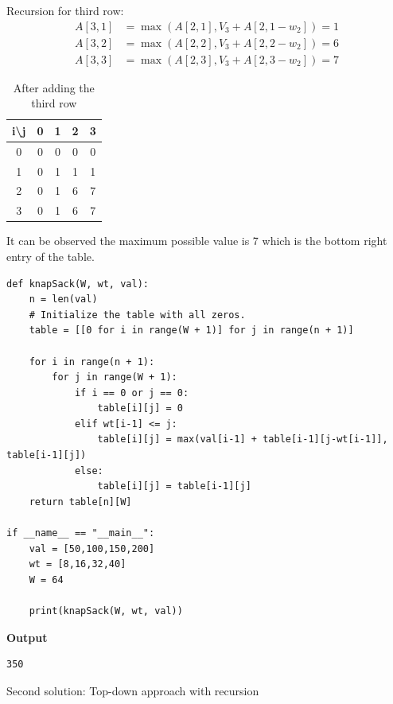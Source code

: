 \documentclass[a4paper,11pt]{book}
\begin{document}
\noindent Recursion for third row:
\begin{align*}
    A[3,1] &= \max(A[2,1], V_3 + A[2,1-w_2]) = 1\\
    A[3,2] &= \max(A[2,2], V_3 + A[2,2-w_2]) = 6\\
    A[3,3] &= \max(A[2,3], V_3 + A[2,3-w_2]) = 7
\end{align*}

\begin{table}[ht]
\centering
\begin{tabular}{|c|c|c|c|c|}
\hline
i\textbackslash{}j & 0 & 1 & 2 & 3 \\ \hline
0                  & 0 & 0 & 0 & 0 \\ \hline
1                  & 0 & 1 & 1 & 1 \\ \hline
2                  & 0 & 1 & 6 & 7 \\ \hline
3                  & 0 & 1 & 6 & 7 \\ \hline
\end{tabular}
\caption*{After adding the third row}
\end{table}

\noindent It can be observed the maximum possible value is 7 which is the bottom right entry of the table.

\begin{lstlisting}
def knapSack(W, wt, val): 
    n = len(val)
    # Initialize the table with all zeros.
    table = [[0 for i in range(W + 1)] for j in range(n + 1)] 
 
    for i in range(n + 1): 
        for j in range(W + 1): 
            if i == 0 or j == 0: 
                table[i][j] = 0
            elif wt[i-1] <= j: 
                table[i][j] = max(val[i-1] + table[i-1][j-wt[i-1]], table[i-1][j]) 
            else: 
                table[i][j] = table[i-1][j] 
    return table[n][W] 

if __name__ == "__main__":
    val = [50,100,150,200]
    wt = [8,16,32,40]
    W = 64
    
    print(knapSack(W, wt, val))
\end{lstlisting}
\textbf{Output}
\begin{lstlisting}
350
\end{lstlisting}

\noindent Second solution: Top-down approach with recursion
\end{document}
